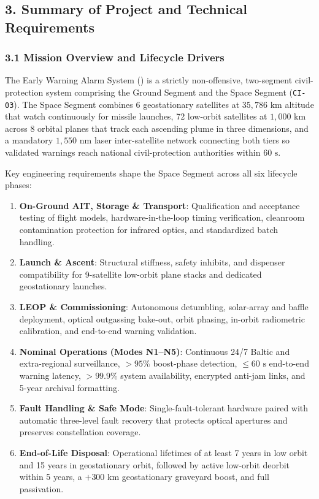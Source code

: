 \subsection{3. Summary of Project and Technical Requirements}

\subsubsection{3.1 Mission Overview and Lifecycle Drivers}

The Early Warning Alarm System () is a strictly non-offensive, two-segment civil-protection system comprising the Ground Segment and the Space Segment (\texttt{CI-03}). The Space Segment combines 6 geostationary satellites at $35{,}786\text{ km}$ altitude that watch continuously for missile launches, 72 low-orbit satellites at $1{,}000\text{ km}$ across 8 orbital planes that track each ascending plume in three dimensions, and a mandatory $1{,}550\text{ nm}$ laser inter-satellite network connecting both tiers so validated warnings reach national civil-protection authorities within $60\text{ s}$.

Key engineering requirements shape the Space Segment across all six lifecycle phases:
\begin{enumerate}[leftmargin=1.6em, itemsep=0.15em, topsep=0.15em]
    \item \textbf{On-Ground AIT, Storage \& Transport}: Qualification and acceptance testing of flight models, hardware-in-the-loop timing verification, cleanroom contamination protection for infrared optics, and standardized batch handling.
    \item \textbf{Launch \& Ascent}: Structural stiffness, safety inhibits, and dispenser compatibility for 9-satellite low-orbit plane stacks and dedicated geostationary launches.
    \item \textbf{LEOP \& Commissioning}: Autonomous detumbling, solar-array and baffle deployment, optical outgassing bake-out, orbit phasing, in-orbit radiometric calibration, and end-to-end warning validation.
    \item \textbf{Nominal Operations (Modes N1--N5)}: Continuous 24/7 Baltic and extra-regional surveillance, $>95\%$ boost-phase detection, $\le 60\text{ s}$ end-to-end warning latency, $>99.9\%$ system availability, encrypted anti-jam links, and 5-year archival formatting.
    \item \textbf{Fault Handling \& Safe Mode}: Single-fault-tolerant hardware paired with automatic three-level fault recovery that protects optical apertures and preserves constellation coverage.
    \item \textbf{End-of-Life Disposal}: Operational lifetimes of at least 7 years in low orbit and 15 years in geostationary orbit, followed by active low-orbit deorbit within 5 years, a $+300\text{ km}$ geostationary graveyard boost, and full passivation.
\end{enumerate}

